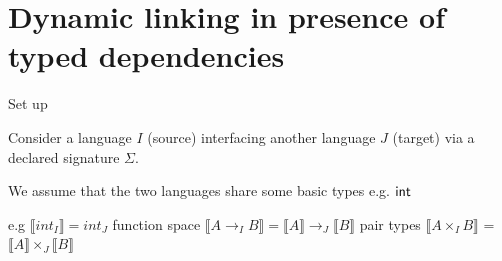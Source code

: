 \documentclass{beamer}
\begin{document}
 \section{Dynamic linking in presence of typed dependencies} 
  \begin{frame}{Set up}
   \begin{outline}
    \1[] Consider a language $I$ (source) interfacing another language $J$ (target) 
    via a declared signature $\Sigma$.
    
    \1[!] We assume that the two languages share some basic types e.g. ${\sf int}$ 
    
      \2[*] e.g $\llbracket int_I\rrbracket = int_J $ 
      \2[*]  function space $\llbracket A\rightarrow_I B\rrbracket =\llbracket A \rrbracket \rightarrow_J \llbracket B \rrbracket $
      \2[*] pair types $\llbracket A\times_I B\rrbracket$ = $\llbracket A\rrbracket\times_J\llbracket B\rrbracket$  
    
    
   \end{outline}

  \end{frame}
\end{document}
